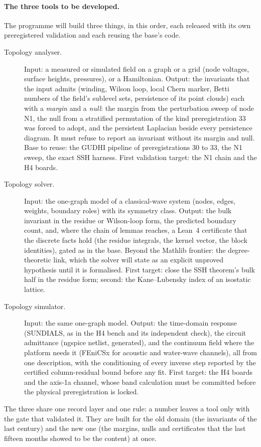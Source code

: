 \documentclass[11pt,a4paper]{article}
\begin{document}
\paragraph{The three tools to be developed.} The programme will build three things, in this order, each released with its own preregistered validation and each reusing the base's code.
\begin{description}
\item[Topology analyser.] Input: a measured or simulated field on a graph or a grid (node voltages, surface heights, pressures), or a Hamiltonian. Output: the invariants that the input admits (winding, Wilson loop, local Chern marker, Betti numbers of the field's sublevel sets, persistence of its point clouds) each with a \emph{margin} and a \emph{null}: the margin from the perturbation sweep of node N1, the null from a stratified permutation of the kind preregistration 33 was forced to adopt, and the persistent Laplacian beside every persistence diagram. It must refuse to report an invariant without its margin and null. Base to reuse: the GUDHI pipeline of preregistrations 30 to 33, the N1 sweep, the exact SSH harness. First validation target: the N1 chain and the H4 boards.
\item[Topology solver.] Input: the one-graph model of a classical-wave system (nodes, edges, weights, boundary roles) with its symmetry class. Output: the bulk invariant in the residue or Wilson-loop form, the predicted boundary count, and, where the chain of lemmas reaches, a Lean~4 certificate that the discrete facts hold (the residue integrals, the kernel vector, the block identities), gated as in the base. Beyond the Mathlib frontier: the degree-theoretic link, which the solver will state as an explicit unproved hypothesis until it is formalised. First target: close the SSH theorem's bulk half in the residue form; second: the Kane--Lubensky index of an isostatic lattice.
\item[Topology simulator.] Input: the same one-graph model. Output: the time-domain response (SUNDIALS, as in the H4 bench and its independent check), the circuit admittance (ngspice netlist, generated), and the continuum field where the platform needs it (FEniCSx for acoustic and water-wave channels), all from one description, with the conditioning of every inverse step reported by the certified column-residual bound before any fit. First target: the H4 boards and the axis-1a channel, whose band calculation must be committed before the physical preregistration is locked.
\end{description}
The three share one record layer and one rule: a number leaves a tool only with the gate that validated it. They are built for the old domain (the invariants of the last century) and the new one (the margins, nulls and certificates that the last fifteen months showed to be the content) at once.
\end{document}
